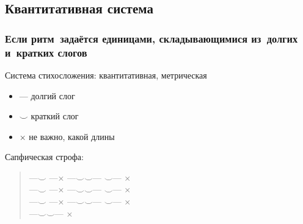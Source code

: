 \documentclass{beamer}
\begin{document}

\subsection{Квантитативная система}\label{sec:metr}

\begin{frame}
\frametitle{Если ритм~задаётся единицами, складывающимися из~долгих и~кратких слогов}

Система стихосложения: квантитативная, метрическая

\begin{itemize}
\item --- долгий слог
\item $\smile$ краткий слог
\item $\times$ не важно, какой длины
\end{itemize}

Сапфическая строфа:

\begin{verse}
---$\smile$ ---$\times$ ---$\smile\smile$--- $\smile$--- $\times$\\
---$\smile$ ---$\times$ ---$\smile\smile$--- $\smile$--- $\times$\\
---$\smile$ ---$\times$ ---$\smile\smile$--- $\smile$--- $\times$\\
\hspace{4em}---$\smile\smile$--- $\times$
\end{verse}


\end{frame}

\end{document}
